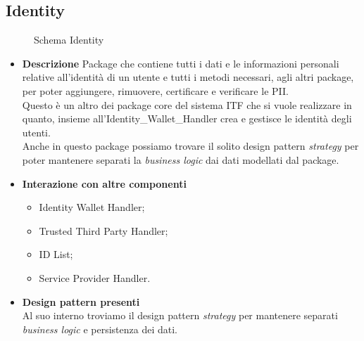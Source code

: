 \subsection{Identity}
\begin{figure}[!h]
	\centering
	\caption{Schema Identity}
\end{figure}
\begin{itemize}
	\item \textbf{Descrizione}
	Package che contiene tutti i dati e le informazioni personali relative all'identità di un utente e tutti i metodi necessari, agli altri package, per poter aggiungere, rimuovere, certificare e verificare le \gls{PII}.\\
	Questo è un altro dei package core del sistema \gls{ITF} che si vuole realizzare in quanto, insieme all'Identity\_Wallet\_Handler crea e gestisce le identità degli utenti.\\
	Anche in questo package possiamo trovare il solito design pattern \textit{strategy} per poter mantenere separati la \textit{business logic} dai dati modellati dal package.
	\item \textbf{Interazione con altre componenti}
	\begin{itemize}
		\item Identity Wallet Handler;
		\item Trusted Third Party Handler;
		\item ID List;
		\item Service Provider Handler.
	\end{itemize}
	\item \textbf{Design pattern presenti}\\
	Al suo interno troviamo il design pattern \textit{strategy} per mantenere separati \textit{business logic} e persistenza dei dati.
\end{itemize}
